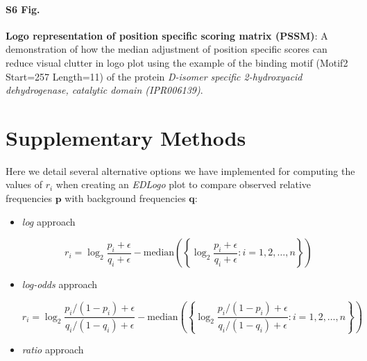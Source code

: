 \documentclass{bmcart}
\def\p{{\mathbf p}}
\def\q{{\mathbf q}}
\begin{document}
\begin{backmatter}
\paragraph*{S6 Fig.}
\label{fig:suppfig6}   
\textbf{Logo representation of position specific scoring matrix (PSSM)}: A demonstration of how the median adjustment of position specific scores can reduce visual clutter in logo plot using the example of the binding motif (Motif2 Start=257 Length=11) of the protein \textit{D-isomer specific 2-hydroxyacid dehydrogenase, catalytic domain (IPR006139)}.



\section*{Supplementary Methods}

Here we detail several alternative options we have implemented for computing the values of $r_i$ when creating an \textit{EDLogo} plot to compare
observed relative frequencies $\p$ with background frequencies $\q$:


\begin{itemize}

\item \textit{log} approach

\begin{equation}\label{log_r}
r_i = \log_2 \frac{p_i + \epsilon}{q_i  + \epsilon} - \textrm{median} \left ( \left \{ \log_2 \frac{p_i + \epsilon}{q_i + \epsilon} : i = 1, 2, \ldots, n \right \} \right )
\end{equation}

\item \textit{log-odds} approach

\begin{equation}\label{log_odds_r}
r_i = \log_2 \frac{p_i/(1 - p_i) + \epsilon}{q_i/(1 - q_i) + \epsilon} - \textrm{median} \left ( \left \{ \log_2 \frac{p_i/(1 - p_i) + \epsilon}{q_i/(1 - q_i) + \epsilon} : i = 1, 2, \ldots, n \right \} \right )
\end{equation}

\item \textit{ratio} approach


\end{itemize}
\end{backmatter}
\end{document}
